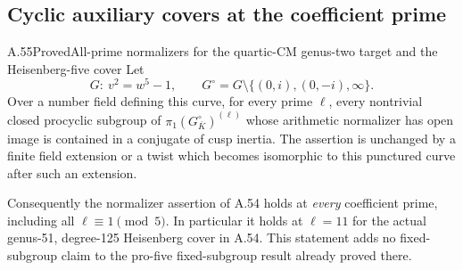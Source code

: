 \subsection{Cyclic auxiliary covers at the coefficient prime}

\begin{statement}{A.55}{Proved}{All-prime normalizers for the quartic-CM genus-two target and the Heisenberg-five cover}
Let
\[
 G:\ v^2=w^5-1,
 \qquad G^\circ=G\setminus\{(0,i),(0,-i),\infty\}.
                                                        \tag{A.55.1}
\]
Over a number field defining this curve, for every prime \(\ell\),
every nontrivial closed procyclic subgroup of
\(\pi_1(G^\circ_{\overline K})^{(\ell)}\) whose arithmetic
normalizer has open image is contained in a conjugate of cusp inertia.
The assertion is unchanged by a finite field extension or a twist
which becomes isomorphic to this punctured curve after such an extension.

Consequently the normalizer assertion of A.54 holds at \emph{every}
coefficient prime, including all \(\ell\equiv1\pmod5\). In particular
it holds at \(\ell=11\) for the actual genus-51, degree-125
Heisenberg cover in A.54. This statement adds no fixed-subgroup
claim to the pro-five fixed-subgroup result already proved there.
\end{statement}
